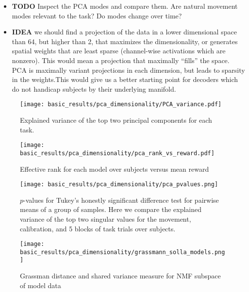 \documentclass[../main.tex]{subfiles}
\begin{document}
\begin{itemize}
  \item \textbf{TODO} Inspect the PCA modes and compare them. Are natural movement modes relevant to the task? Do modes change over time?
  \item \textbf{IDEA} we should find a projection of the data in a lower dimensional space than 64, but higher than 2, that maximizes the dimensionality, or generates spatial weights that are least sparse (channel-wise activations which are nonzero). This would mean a projection that maximally ``fills'' the space. PCA is maximally variant projections in each dimension, but leads to sparsity in the weights.This would give us a better starting point for decoders which do not handicap subjects by their underlying manifold.
\end{itemize}


\begin{figure}[H]%
  \centering
  \texttt{[image: basic\_results/pca\_dimensionality/PCA\_variance.pdf]}
  \caption[Explained variance for PCA over tasks]{Explained variance of the top two principal components for each task.}\label{fig:pca_variance}
\end{figure}

\begin{figure}[H]%
  \centering
  \texttt{[image: basic\_results/pca\_dimensionality/pca\_rank\_vs\_reward.pdf]}
  \caption[Effective rank for each model over subjects versus mean reward]{Effective rank for each model over subjects versus mean reward}\label{fig:pca_rank_vs_reward}
\end{figure}

\begin{figure}[H]%
  \centering
  \texttt{[image: basic\_results/pca\_dimensionality/pca\_pvalues.png]}
  \caption[Explained variance Tukey test]{$p$-values for Tukey's honestly significant difference test for pairwise means of a group of samples. Here we compare the explained variance of the top two singular values for the movement, calibration, and 5 blocks of task trials over subjects.}\label{fig:pca_pvalues}
\end{figure}

\begin{figure}[H]%
  \centering
  \texttt{[image: basic\_results/pca\_dimensionality/grassmann\_solla\_models.png]}
  \caption[Comparison of PCA subspaces over models]{Grassman distance and shared variance measure for NMF subspace of model data}\label{fig:grassman_solla_pca}
\end{figure}
\end{document}
